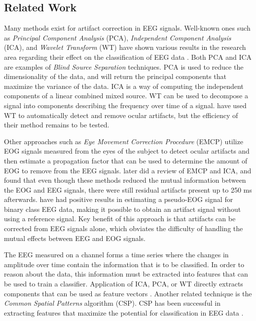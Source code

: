 \subsection{Related Work} \label{sec:relatedwork}
Many methods exist for artifact correction in EEG signals. Well-known ones such as \emph{Principal Component Analysis} (PCA), \emph{Independent Component Analysis} (ICA), and \emph{Wavelet Transform} (WT) have shown various results in the research area regarding their effect on the classification of EEG data   \citep{uriguen2015eeg}. Both PCA and ICA are examples of \emph{Blind Source Separation} techniques. PCA is used to reduce the dimensionality of the data, and will return the principal components that maximize the variance of the data. ICA is a way of computing the independent components of a linear combined mixed source. WT can be used to decompose a signal into components describing the frequency over time of a signal. \cite{krishnaveni2006automatic} have used WT to automatically detect and remove ocular artifacts, but the efficiency of their method remains to be tested.

Other approaches such as \emph{Eye Movement Correction Procedure} (EMCP) \citep{gratton1983new} utilize EOG signals measured from the eyes of the subject to detect ocular artifacts and then estimate a propagation factor that can be used to determine the amount of EOG to remove from the EEG signals. \cite{hoffmann2008correction} later did a review of EMCP and ICA, and found that even though these methods reduced the mutual information between the EOG and EEG signals, there were still residual artifacts present up to 250 ms afterwards. \cite{li2015ocular} have had positive results in estimating a pseudo-EOG signal for binary class EEG data, making it possible to obtain an artifact signal without using a reference signal. Key benefit of this approach is that artifacts can be corrected from EEG signals alone, which obviates the difficulty of handling the mutual effects between EEG and EOG signals.

The EEG measured on a channel forms a time series where the changes in amplitude over time contain the information that is to be classified. In order to reason about the data, this information must be extracted into features that can be used to train a classifier. Application of ICA, PCA, or WT directly extracts components that can be used as feature vectors \citep{uriguen2015eeg}. Another related technique is the \emph{Common Spatial Patterns} algorithm (CSP). CSP has been successful in extracting features that maximize the potential for classification in EEG data \citep{ang2008filter,ang2012filter}.

